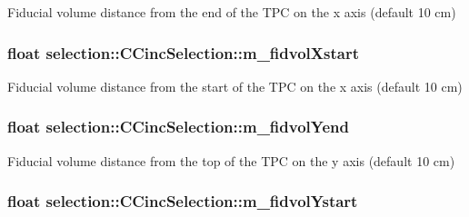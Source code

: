 Fiducial volume distance from the end of the T\-P\-C on the x axis (default 10 cm) \hypertarget{classselection_1_1CCincSelection_aab38faac4866d19339aadbc3ac1eb55b}{
\subsubsection[{m\-\_\-fidvol\-Xstart}]{\setlength{\rightskip}{0pt plus 5cm}float selection\-::\-C\-Cinc\-Selection\-::m\-\_\-fidvol\-Xstart\hspace{0.3cm}{\ttfamily [private]}}}\label{classselection_1_1CCincSelection_aab38faac4866d19339aadbc3ac1eb55b}
Fiducial volume distance from the start of the T\-P\-C on the x axis (default 10 cm) \hypertarget{classselection_1_1CCincSelection_a01d6a0608356e4ea245f23e1b6934fd3}{
\subsubsection[{m\-\_\-fidvol\-Yend}]{\setlength{\rightskip}{0pt plus 5cm}float selection\-::\-C\-Cinc\-Selection\-::m\-\_\-fidvol\-Yend\hspace{0.3cm}{\ttfamily [private]}}}\label{classselection_1_1CCincSelection_a01d6a0608356e4ea245f23e1b6934fd3}
Fiducial volume distance from the top of the T\-P\-C on the y axis (default 10 cm) \hypertarget{classselection_1_1CCincSelection_a28900415eda1eb30d6263081e943e6a5}{
\subsubsection[{m\-\_\-fidvol\-Ystart}]{\setlength{\rightskip}{0pt plus 5cm}float selection\-::\-C\-Cinc\-Selection\-::m\-\_\-fidvol\-Ystart\hspace{0.3cm}{\ttfamily [private]}}}\label{classselection_1_1CCincSelection_a28900415eda1eb30d6263081e943e6a5}
